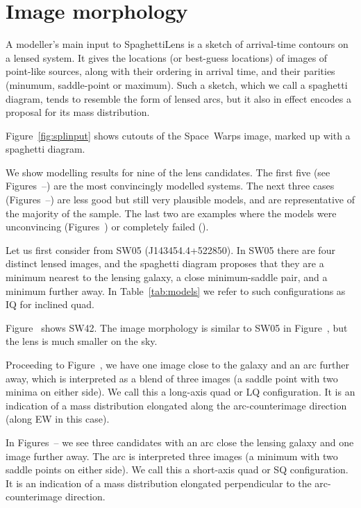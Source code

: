 \section{Image morphology}\label{sec:morph}

A modeller's main input to SpaghettiLens is a sketch of arrival-time
contours on a lensed system.  It gives the locations (or best-guess
locations) of images of point-like sources, along with their ordering
in arrival time, and their parities (minumum, saddle-point or
maximum).  Such a sketch, which we call a spaghetti diagram, tends to
resemble the form of lensed arcs, but it also in effect 
encodes a proposal for its mass distribution.

Figure~\ref{fig:splinput} shows cutouts of the Space~Warps image,
marked up with a spaghetti diagram.

We show modelling results for nine of the lens candidates.  The first
five (see Figures~--) are the most
convincingly modelled systems.  The next three cases
(Figures~--) are less good but still very
plausible models, and are representative of the majority of the
sample.  The last two are examples where the models were unconvincing
(Figures~) or completely failed ().


Let us first consider from SW05 (J143454.4+522850).
In SW05 there are four distinct lensed images, and the spaghetti
diagram proposes that they are a minimum nearest to the lensing
galaxy, a close minimum-saddle pair, and a minimum further away. In
Table~\ref{tab:models} we refer to such configurations as IQ for
inclined quad.

Figure~ shows SW42.  The image morphology is similar to
SW05 in Figure~, but the lens is much smaller on the sky.

Proceeding to Figure~, we have one image close to the
galaxy and an arc further away, which is interpreted as a blend of
three images (a saddle point with two minima on either side).  We call
this a long-axis quad or LQ configuration.  It is an indication of a
mass distribution elongated along the arc-counterimage direction
(along EW in this case).

In Figures~-- we see three candidates with
an arc close the lensing galaxy and one image further away.  The arc
is interpreted three images (a minimum with two saddle points on
either side).  We call this a short-axis quad or SQ configuration.  It
is an indication of a mass distribution elongated perpendicular to the
arc-counterimage direction.

